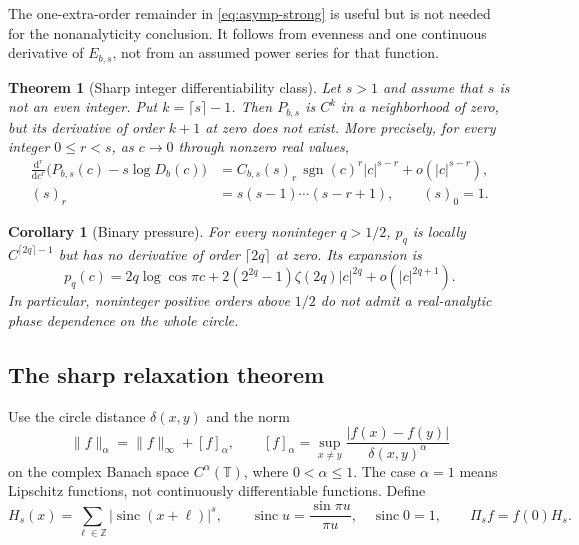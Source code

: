\documentclass[11pt,a4paper]{article}
\numberwithin{equation}{section}
\newtheorem{theorem}{Theorem}[section]
\newtheorem{corollary}[corollary]{Corollary}
\theoremstyle{definition}
\theoremstyle{remark}
\newcommand{\TT}{\mathbb T}
\newcommand{\ZZ}{\mathbb Z}
\newcommand{\Proj}{\Pi}
\newcommand{\sgn}{\operatorname{sgn}}
\newcommand{\sinc}{\operatorname{sinc}}
\begin{document}
The one-extra-order remainder in \cref{eq:asymp-strong} is useful but is
not needed for the nonanalyticity conclusion. It follows from evenness
and one continuous derivative of $E_{b,s}$, not from an assumed power
series for that function.

\begin{theorem}[Sharp integer differentiability class]
\label{thm:regularity}
Let $s>1$ and assume that $s$ is not an even integer. Put
$k=\lceil s\rceil-1$. Then $P_{b,s}$ is $C^k$ in a neighborhood of zero,
but its derivative of order $k+1$ at zero does not exist. More precisely,
for every integer $0\le r<s$, as $c\to0$ through nonzero real values,
\begin{align}
 \frac{\mathrm d^r}{\mathrm dc^r}
 \bigl(P_{b,s}(c)-s\log D_b(c)\bigr)
 & = C_{b,s}(s)_r\,\sgn(c)^r |c|^{s-r}
   +o(|c|^{s-r}),
 \label{eq:derivative-cusp}\\
 (s)_r&=s(s-1)\cdots(s-r+1),\qquad (s)_0=1.
\end{align}
\end{theorem}

\begin{corollary}[Binary pressure]
\label{cor:binary}
For every noninteger $q>1/2$, $p_q$ is locally
$C^{\lceil2q\rceil-1}$ but has no derivative of order $\lceil2q\rceil$
at zero. Its expansion is
\begin{equation}
 p_q(c)=2q\log\cos\pi c+
 2(2^{2q}-1)\zeta(2q)|c|^{2q}+o(|c|^{2q+1}).
 \label{eq:binary-cusp}
\end{equation}
In particular, noninteger positive orders above $1/2$ do not admit a
real-analytic phase dependence on the whole circle.
\end{corollary}

\subsection{The sharp relaxation theorem}
Use the circle distance $\delta(x,y)$ and the norm
\[
 \|f\|_{\alpha}=\|f\|_\infty+[f]_{\alpha},\qquad
 [f]_{\alpha}=\sup_{x\ne y}\frac{|f(x)-f(y)|}{\delta(x,y)^\alpha}
\]
on the complex Banach space $C^\alpha(\TT)$, where $0<\alpha\le1$.
The case $\alpha=1$ means Lipschitz functions, not continuously
differentiable functions. Define
\begin{equation}
 H_s(x)=\sum_{\ell\in\ZZ}|\sinc(x+\ell)|^s,
 \qquad \sinc u=\frac{\sin\pi u}{\pi u},\quad \sinc0=1,
 \qquad \Proj_sf=f(0)H_s.
 \label{eq:H}
\end{equation}
\end{document}
